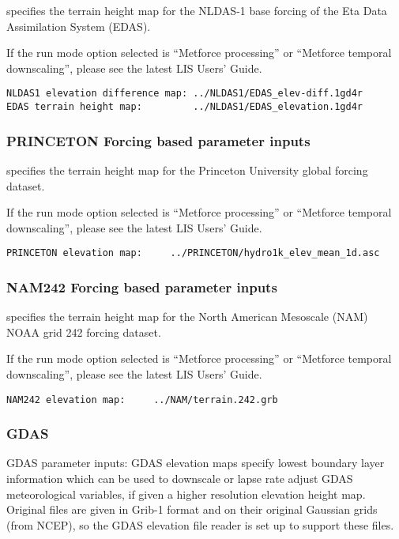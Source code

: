   specifies the terrain height map
 for the NLDAS-1 base forcing of the Eta Data Assimilation
 System (EDAS).

 If the run mode option selected is ``Metforce processing'' or
 ``Metforce temporal downscaling'', please see the latest LIS Users'
 Guide.

 

 \begin{Verbatim}[frame=single]
NLDAS1 elevation difference map: ../NLDAS1/EDAS_elev-diff.1gd4r
EDAS terrain height map:         ../NLDAS1/EDAS_elevation.1gd4r
 \end{Verbatim}

 
 \subsubsection{PRINCETON Forcing based parameter inputs}

  specifies the terrain height map
 for the Princeton University global forcing dataset.

 If the run mode option selected is ``Metforce processing'' or
 ``Metforce temporal downscaling'', please see the latest LIS Users'
 Guide.

 

 \begin{Verbatim}[frame=single]
PRINCETON elevation map:     ../PRINCETON/hydro1k_elev_mean_1d.asc
 \end{Verbatim}

 
 \subsubsection{NAM242 Forcing based parameter inputs}

  specifies the terrain height map
 for the North American Mesoscale (NAM) NOAA grid 242 forcing dataset.

 If the run mode option selected is ``Metforce processing'' or
 ``Metforce temporal downscaling'', please see the latest LIS Users'
 Guide.

 

 \begin{Verbatim}[frame=single]
NAM242 elevation map:     ../NAM/terrain.242.grb
 \end{Verbatim}

 
 \subsubsection{GDAS} \label{sssec:forcings_gdas}
 GDAS parameter inputs:  GDAS elevation maps specify lowest
 boundary layer information which can be used to downscale or
 lapse rate adjust GDAS meteorological variables, if given a higher 
 resolution elevation height map. Original files are given in
 Grib-1 format and on their original Gaussian grids (from NCEP), 
 so the GDAS elevation file reader is set up to support these files.

